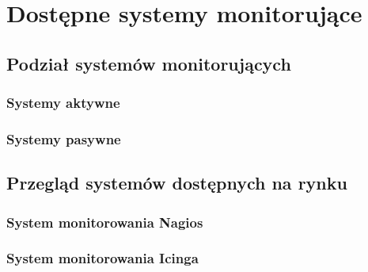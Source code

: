 \chapter{Dostępne systemy monitorujące}

\section[Podział systemów][Podział systemów monitorujących]{Podział systemów monitorujących}

\subsection[Systemy aktywne][Systemy aktywne]{Systemy aktywne}

\subsection[Systemy pasywne][Systemy pasywne]{Systemy pasywne}

\section[Przegląd systemów][Przegląd systemów dostępnych na rynku]{Przegląd systemów dostępnych na rynku}

\subsection[Nagios][System monitorowania Nagios]{System monitorowania Nagios}

\subsection[Icinga][System monitorowania Icinga]{System monitorowania Icinga}
\label{subsec:Icinga}


